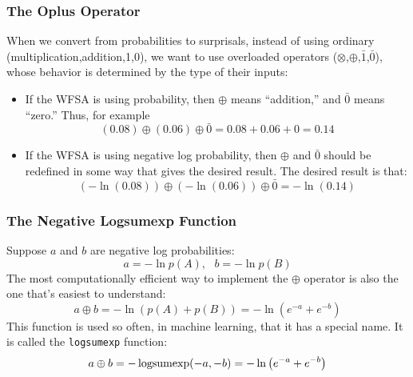 \documentclass{beamer}
\newcommand{\logsumexp}{\operatornamewithlimits{logsumexp}}
\begin{document}
\begin{frame}
  \frametitle{The Oplus Operator}

  When we convert from probabilities to surprisals, instead of using
  ordinary (multiplication,addition,1,0), we want to use
  overloaded operators ($\otimes$,$\oplus$,$\bar{1}$,$\bar{0}$),
  whose behavior is determined by the type of their inputs:
  \begin{itemize}
  \item If the WFSA is using probability, then $\oplus$ means
    ``addition,'' and $\bar{0}$ means ``zero.''  Thus, for example
    \begin{displaymath}
      (0.08)\oplus(0.06)\oplus\bar{0} = 0.08+0.06+0 = 0.14
    \end{displaymath}
  \item If the WFSA is using negative log probability, then $\oplus$
    and $\bar{0}$ should be redefined in some way that gives the
    desired result.  The desired  result is that:
    \begin{displaymath}
      \left(-\ln(0.08)\right)\oplus\left(-\ln(0.06)\right)\oplus\bar{0} = -\ln(0.14)
    \end{displaymath}
  \end{itemize}
\end{frame}

\begin{frame}
  \frametitle{The Negative Logsumexp Function}

  Suppose $a$ and $b$ are negative log probabilities:
  \begin{displaymath}
    a=-\ln p(A),~~~b=-\ln p(B)
  \end{displaymath}
  The most computationally efficient way to implement the $\oplus$
  operator is also the one that's easiest to understand:
  \begin{displaymath}
    a\oplus b = -\ln \left(p(A)+p(B)\right)= -\ln \left(e^{-a}+e^{-b}\right)
  \end{displaymath}
  This function is used so often, in machine learning, that it has a
  special name.  It is called the {\tt logsumexp} function:
  \begin{displaymath}
    a\oplus b = -\logsumexp(-a,-b) = -\ln \left(e^{-a}+e^{-b}\right)
  \end{displaymath}
\end{frame}
\end{document}
